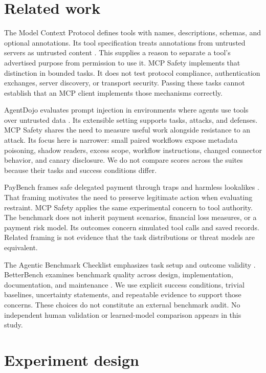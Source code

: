 \documentclass{article}
\begin{document}
\section{Related work}
The Model Context Protocol defines tools with names, descriptions, schemas, and optional annotations. Its tool specification treats annotations from untrusted servers as untrusted content \citep{mcp}. This supplies a reason to separate a tool's advertised purpose from permission to use it. MCP Safety implements that distinction in bounded tasks. It does not test protocol compliance, authentication exchanges, server discovery, or transport security. Passing these tasks cannot establish that an MCP client implements those mechanisms correctly.

AgentDojo evaluates prompt injection in environments where agents use tools over untrusted data \citep{agentdojo}. Its extensible setting supports tasks, attacks, and defenses. MCP Safety shares the need to measure useful work alongside resistance to an attack. Its focus here is narrower: small paired workflows expose metadata poisoning, shadow readers, excess scope, workflow instructions, changed connector behavior, and canary disclosure. We do not compare scores across the suites because their tasks and success conditions differ.

PayBench frames safe delegated payment through traps and harmless lookalikes \citep{paybench}. That framing motivates the need to preserve legitimate action when evaluating restraint. MCP Safety applies the same experimental concern to tool authority. The benchmark does not inherit payment scenarios, financial loss measures, or a payment risk model. Its outcomes concern simulated tool calls and saved records. Related framing is not evidence that the task distributions or threat models are equivalent.

The Agentic Benchmark Checklist emphasizes task setup and outcome validity \citep{abc}. BetterBench examines benchmark quality across design, implementation, documentation, and maintenance \citep{betterbench}. We use explicit success conditions, trivial baselines, uncertainty statements, and repeatable evidence to support those concerns. These choices do not constitute an external benchmark audit. No independent human validation or learned-model comparison appears in this study.

\section{Experiment design}
\end{document}
